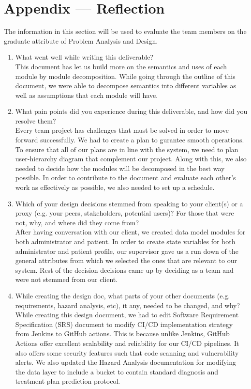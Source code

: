\documentclass[12pt, titlepage]{article}
\begin{document}
\section*{Appendix --- Reflection}


The information in this section will be used to evaluate the team members on the
graduate attribute of Problem Analysis and Design.



\begin{enumerate}
  \item What went well while writing this deliverable?\\
  This document has let us build more on the semantics and uses of each module by module decomposition. While going through the outline of this document, we were able to decompose semantics into different variables as well as assumptions that each module will have.

  \item What pain points did you experience during this deliverable, and how did you resolve them?\\
  Every team project has challenges that must be solved in order to move forward successfully. We had to create a plan to gurantee smooth operations. To ensure that all of our plans are in line with the system, we need to plan user-hierarchy diagram that complement our project. Along with this, we also needed to decide how the modules will be decomposed in the best way possible. In order to contribute to the document and evaluate each other’s work as effectively as possible, we also needed to set up a schedule. 

  \item Which of your design decisions stemmed from speaking to your client(s) or a proxy (e.g. your peers, stakeholders, potential users)? For those that were not, why, and where did they come from?\\
  After having conversation with our client, we created data model modules for both administrator and patient. In order to create state variables for both administrator and patient profile, our supervisor gave us a run down of the general attributes from which we selected the ones that are relevant to our system. Rest of the decision decisions came up by deciding as a team and were not stemmed from our client.  

  \item While creating the design doc, what parts of your other documents (e.g. requirements, hazard analysis, etc), it any, needed to be changed, and why?\\
  While creating this design document, we had to edit Software Requirement Specification (SRS) document to modify CI/CD implementation strategy from Jenkins to GitHub actions. This is because unlike Jenkins, GitHub Actions offer excellent scalability and reliability for our CI/CD pipelines. It also offers some security features such that code scanning and vulnerability alerts. We also updated the Hazard Analysis documentation for modifying the data layer to include a bucket to contain standard diagnosis and treatment plan prediction protocol.  


\end{enumerate}
\end{document}
